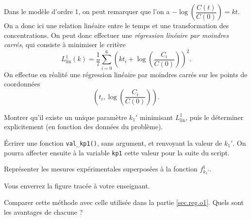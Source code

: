 Dans le modèle d'ordre 1, on peut remarquer que l'on a $\displaystyle -\log\left(\dfrac{C(t)}{C(0)}\right) = kt$. 
On a donc ici une relation linéaire entre le temps et une transformation des concentrations. On peut donc effectuer une \emph{régression linéaire par moindres carrés}, qui consiste à minimiser le critère 
\begin{equation*}
  L^1_{\mathrm{lin}}(k) = \dfrac{1}{7} \sum_{i=0}^6 \left( k t_i + \log\left(\dfrac{C_i}{C(0)}\right) \right)^2.
\end{equation*}
On effectue en réalité une régression linéaire par moindres carrés sur les points de coordonnées 
\begin{equation*}
  \left(t_i,\log\left(\dfrac{C_i}{C(0)}\right)\right).
\end{equation*}

\question{} Montrer qu'il existe un unique paramètre $k_1'$ minimisant $L^1_{\mathrm{lin}}$, puis le déterminer explicitement (en fonction des données du problème).

\medskip{}

\question{} \'Ecrirer une fonction \texttt{val\_kp1()}, sans argument, et renvoyant la valeur de $k_1'$. On pourra affecter ensuite à la variable \texttt{kp1} cette valeur pour la suite du script.

\medskip{}

\question{\label{qu:traceflin}} Représenter les mesures expérimentales superposées à la fonction $f^1_{k_1'}$.

  Vous enverrez la figure tracée à votre enseignant.

\medskip{}
  
\question{} Comparer cette méthode avec celle utilisée dans la partie \ref{sec.reg.o1}. Quels sont les avantages de chacune ?


